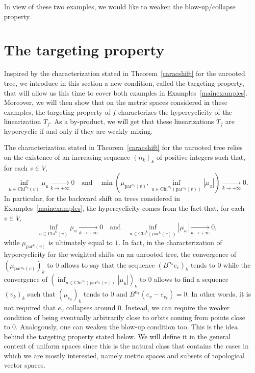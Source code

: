 \documentclass[12pt,english]{amsart}
\numberwithin{equation}{section}
\theoremstyle{plain}
\theoremstyle{definition}
\def\pare{\text{par}}
\begin{document}
In view of these two examples, we would like to weaken the blow-up/collapse property.  



 \section{The targeting property}

 Inspired by the characterization stated in Theorem~\ref{caracshift} for the unrooted tree, we introduce in this section a new condition, called the {targeting property}, that will allow us this time to cover both examples in Examples~\ref{mainexamples}. Moreover, we will then show that on the metric spaces considered in these examples, the targeting property of $f$ characterizes the hypercyclicity of the linearization $T_f$. As a by-product, we will get that these linearizations $T_f$ are hypercyclic if and only if they are weakly mixing.

The characterization stated in Theorem~\ref{caracshift} for the unrooted tree relies on the existence of an increasing sequence $(n_k)_k$ of positive integers such that, for each $v\in V$,
\[\inf_{u\in \text{Chi}^{n_k}(v)}\mu_u\xrightarrow[k\to +\infty]{} 0 \quad \text{and}\quad \min\left(\mu_{\pare^{n_k}(v)},\inf_{u\in \text{Chi}^{n_k}(\pare^{n_k}(v))}|\mu_u|\right)\xrightarrow[k\to +\infty]{} 0.\]
In particular, for the backward shift on trees considered in Examples~\ref{mainexamples}, the hypercyclicity comes from the fact that, for each $v\in V$,
\[\inf_{u\in \text{Chi}^{k}(v)}\mu_u \xrightarrow[k\to +\infty]{} 0 \quad \text{and}\quad \inf_{u\in \text{Chi}^{k}(\pare^{k}(v))}|\mu_u| \xrightarrow[k\to +\infty]{} 0,\]
while $\mu_{\pare^{k}(v)}$ is ultimately equal to $1$. In fact, in the characterization of hypercyclicity for the weighted shifts on an unrooted tree, the convergence of $(\mu_{\pare^{n_k}(v)})_k$ to $0$ allows to say that the sequence $(B^{n_k}e_v)_k$ tends to $0$ while the convergence of $(\inf_{u\in \text{Chi}^{n_k}(\pare^{n_k}(v))}|\mu_u|)_k$
 to $0$ allows to find a sequence $(v_k)_k$ such that $(\mu_{v_k})_k$ tends to $0$ and $B^{n_k}(e_v-e_{v_k})=0$. In other words, it is not required that $e_v$ collapses around $0$. Instead, we can require the weaker condition of being eventually arbitrarily close to orbits coming from points close to $0$. Analogously, one can weaken the blow-up condition too.  This is the idea behind the targeting property stated below. We will define it in the general context of uniform spaces  since this is the natural class that contains the cases in which we are mostly interested, namely metric spaces and subsets of topological vector spaces. 
\end{document}
